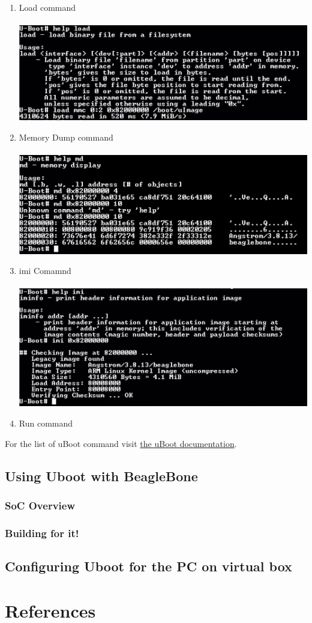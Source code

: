 \documentclass{article}
\begin{document}
\begin{enumerate}
    \item Load command\\\\
    \includegraphics[scale=0.50]{./resources/img/uBootCmd-load.png}

    \item Memory Dump command\\\\
    \includegraphics[scale=0.50]{./resources/img/uBootCmd-md.png}

    \item imi Comamnd\\\\
    \includegraphics[scale=0.50]{./resources/img/uBootCmd-imi.png}

    \item Run command
\end{enumerate}

For the list of uBoot command visit \href{https://www.denx.de/wiki/U-Bootdoc/BasicCommandSet}{the uBoot documentation}.

\subsection{Using Uboot with BeagleBone}
\subsubsection{SoC Overview}
\subsubsection{Building for it!}
\subsection{Configuring Uboot for the PC on virtual box}

\section{References}
\end{document}
